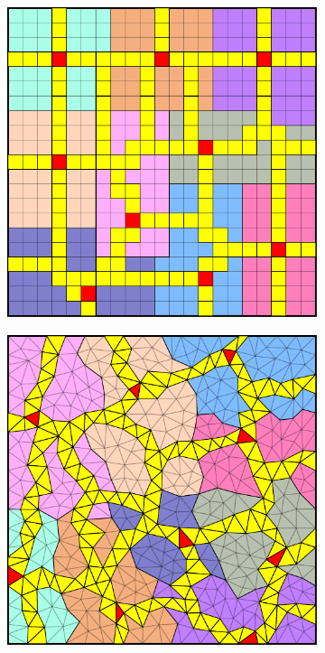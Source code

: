 \begin{figure}[htbp]
\begin{subfigure}[t]{0.3\textwidth}
  \end{subfigure}
  \hfill
  \begin{subfigure}[t]{0.3\textwidth}
    \centerline{\includegraphics[width=0.9\linewidth]{figs/square_cart_metis_cell_dual}}
  \end{subfigure}
  \hfill
  \begin{subfigure}[t]{0.3\textwidth}
    \centerline{\includegraphics[width=0.9\linewidth]{figs/square_tria_metis_cell_dual}}

\end{subfigure}
\end{figure}
